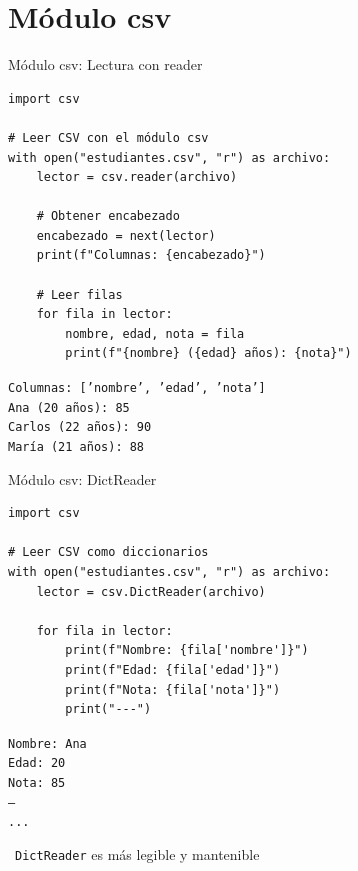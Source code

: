 \documentclass{beamer}
\begin{document}
\section{Módulo csv}

\begin{frame}[fragile]{Módulo csv: Lectura con reader \faBookOpen}
\begin{lstlisting}
import csv

# Leer CSV con el módulo csv
with open("estudiantes.csv", "r") as archivo:
    lector = csv.reader(archivo)
    
    # Obtener encabezado
    encabezado = next(lector)
    print(f"Columnas: {encabezado}")
    
    # Leer filas
    for fila in lector:
        nombre, edad, nota = fila
        print(f"{nombre} ({edad} años): {nota}")
\end{lstlisting}

\vspace{-0.2cm}
\begin{tcolorbox}[colback=green!10,colframe=green,title={\small\faArrowCircleRight \ Salida},coltitle=fg0,left=3pt,right=3pt,top=2pt,bottom=2pt,boxsep=1pt]
\small\texttt{Columnas: ['nombre', 'edad', 'nota']\\
Ana (20 años): 85\\
Carlos (22 años): 90\\
María (21 años): 88}
\end{tcolorbox}
\end{frame}

\begin{frame}[fragile]{Módulo csv: DictReader \faBook}
\begin{lstlisting}
import csv

# Leer CSV como diccionarios
with open("estudiantes.csv", "r") as archivo:
    lector = csv.DictReader(archivo)
    
    for fila in lector:
        print(f"Nombre: {fila['nombre']}")
        print(f"Edad: {fila['edad']}")
        print(f"Nota: {fila['nota']}")
        print("---")
\end{lstlisting}

\vspace{-0.2cm}
\begin{tcolorbox}[colback=green!10,colframe=green,title={\small\faArrowCircleRight \ Salida},coltitle=fg0,left=3pt,right=3pt,top=2pt,bottom=2pt,boxsep=1pt]
\small\texttt{Nombre: Ana\\
Edad: 20\\
Nota: 85\\
---\\
...}
\end{tcolorbox}

\vspace{-0.1cm}
\begin{notebox}
\small\faLightbulb\ \texttt{DictReader} es más legible y mantenible
\end{notebox}
\end{frame}
\end{document}

